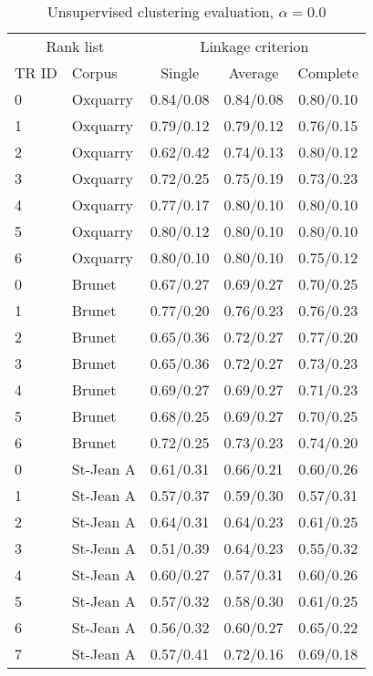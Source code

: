\newpage

\begin{table}
  \centering
  \caption{Unsupervised clustering evaluation, $\alpha = 0.0$}
  \label{tab:unsupervised_clustering_full}

  \begin{tabular}{l l c c c}
    \toprule
    \multicolumn{2}{c}{Rank list} & \multicolumn{3}{c}{Linkage criterion} \\
    TR ID & Corpus & Single & Average & Complete \\
    \midrule
    0 & Oxquarry & 0.84/0.08 & 0.84/0.08 & 0.80/0.10 \\
    1 & Oxquarry & 0.79/0.12 & 0.79/0.12 & 0.76/0.15 \\
    2 & Oxquarry & 0.62/0.42 & 0.74/0.13 & 0.80/0.12 \\
    3 & Oxquarry & 0.72/0.25 & 0.75/0.19 & 0.73/0.23 \\
    4 & Oxquarry & 0.77/0.17 & 0.80/0.10 & 0.80/0.10 \\
    5 & Oxquarry & 0.80/0.12 & 0.80/0.10 & 0.80/0.10 \\
    6 & Oxquarry & 0.80/0.10 & 0.80/0.10 & 0.75/0.12 \\
    0 & Brunet & 0.67/0.27 & 0.69/0.27 & 0.70/0.25 \\
    1 & Brunet & 0.77/0.20 & 0.76/0.23 & 0.76/0.23 \\
    2 & Brunet & 0.65/0.36 & 0.72/0.27 & 0.77/0.20 \\
    3 & Brunet & 0.65/0.36 & 0.72/0.27 & 0.73/0.23 \\
    4 & Brunet & 0.69/0.27 & 0.69/0.27 & 0.71/0.23 \\
    5 & Brunet & 0.68/0.25 & 0.69/0.27 & 0.70/0.25 \\
    6 & Brunet & 0.72/0.25 & 0.73/0.23 & 0.74/0.20 \\
    0 & St-Jean A & 0.61/0.31 & 0.66/0.21 & 0.60/0.26 \\
    1 & St-Jean A & 0.57/0.37 & 0.59/0.30 & 0.57/0.31 \\
    2 & St-Jean A & 0.64/0.31 & 0.64/0.23 & 0.61/0.25 \\
    3 & St-Jean A & 0.51/0.39 & 0.64/0.23 & 0.55/0.32 \\
    4 & St-Jean A & 0.60/0.27 & 0.57/0.31 & 0.60/0.26 \\
    5 & St-Jean A & 0.57/0.32 & 0.58/0.30 & 0.61/0.25 \\
    6 & St-Jean A & 0.56/0.32 & 0.60/0.27 & 0.65/0.22 \\
    7 & St-Jean A & 0.57/0.41 & 0.72/0.16 & 0.69/0.18 \\

\end{tabular}
\end{table}
